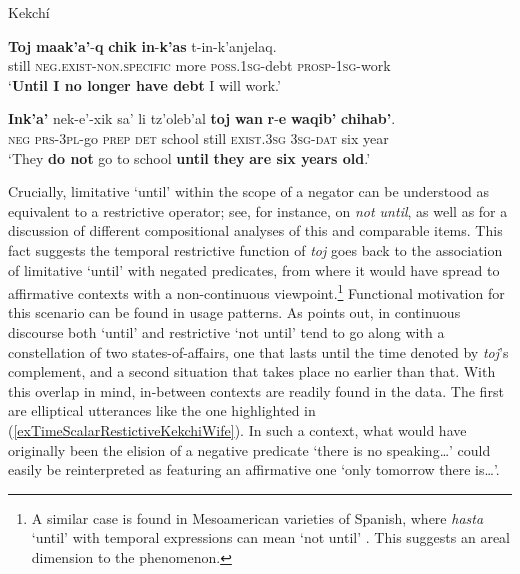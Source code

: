 \begin{exe}
	\ex	
	\begin{xlist}
		\exi{}Kekchí

		\ex
		\gll \textbf{Toj} \textbf{maak’a’}-\textbf{q} \textbf{chik} \textbf{in}-\textbf{k’as} t-in-k’anjelaq.\label{exLimitativeKekchi1}\\
	still \textsc{neg}.\textsc{exist}-\textsc{non}.\textsc{specific} more \textsc{poss}.1\textsc{sg}-debt \textsc{prosp}-1\textsc{sg}-work\\
	\glt \lq \textbf{Until I no longer have debt} I will work.\rq{}

		\ex
		\gll \textbf{Ink'a'} nek-e'-xik sa' li tz'oleb'al \textbf{toj} \textbf{wan} \textbf{r}-\textbf{e} \textbf{waqib'} \textbf{chihab'}.\label{exLimitativeKekchi2}\\
	\textsc{neg} \textsc{prs}-3\textsc{pl}-go \textsc{prep} \textsc{det} school still \textsc{exist}.3\textsc{sg} 3\textsc{sg}-\textsc{dat} six year\\
	\glt \lq They \textbf{do not} go to school \textbf{until} \textbf{they} \textbf{are six years old}.'\\\parencite[466, 480]{Kockelman2020}
	\end{xlist}
\end{exe}

Crucially, limitative \lq until\rq{ }within the scope of a negator can be understood as equivalent to a restrictive operator; see, for instance, \textcite[159–162]{Koenig1991} on  \textit{not until}, as well as \textcite{deSwartEtAl2022} for a discussion of different compositional analyses of this and comparable items. This fact suggests the temporal restrictive function of \textit{toj} goes back to the association of limitative \lq until\rq{ }with negated predicates, from where it would have spread to affirmative contexts with a non-continuous viewpoint.\footnote{A similar case is found in Mesoamerican varieties of Spanish, where \textit{hasta} \lq until' with temporal expressions can mean \lq not until' \parencite[s.v. \textit{hasta}]{RAEDictionary}. This suggests an areal dimension to the phenomenon.} Functional motivation for this scenario can be found in usage patterns. As \textcite{Kockelman2020} points out, in continuous discourse both \lq until\rq{ }and restrictive \lq not until\rq{ }tend to go along with a constellation of two states-of-affairs, one that lasts until the time denoted by \textit{toj}'s complement, and a second situation that takes place no earlier than that. With this overlap in mind, in-between contexts are readily found in the data. The first are elliptical utterances like the one highlighted in (\ref{exTimeScalarRestictiveKekchiWife}). In such a context, what would have originally been the elision of a negative predicate \lq there is no speaking…\rq{ }could easily be reinterpreted as featuring an affirmative one \lq  only tomorrow there is…\rq{}.
\pagebreak

